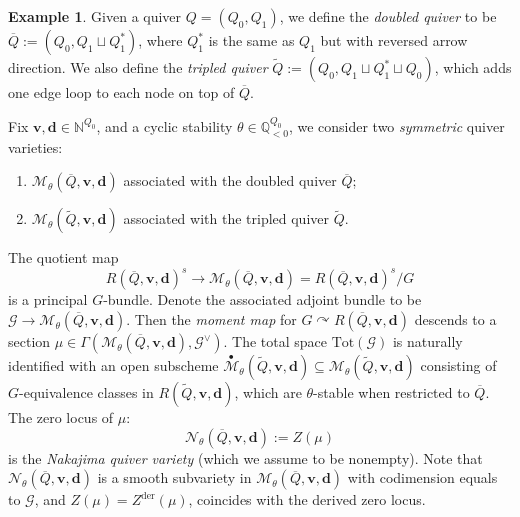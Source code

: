\documentclass[10pt]{amsart}
\theoremstyle{definition}
\newtheorem{Example}[Theorem]{Example}
\numberwithin{equation}{section}
\newcommand{\der}{\mathrm{der}}
\newcommand{\bN}{\mathbb{N}}
\newcommand{\bQ}{\mathbb{Q}}
\newcommand{\cM}{\mathcal{M}}
\newcommand{\cN}{\mathcal{N}}
\begin{document}
\begin{Example}
\label{ex doubled vs tripled}
Given a quiver $Q=(Q_0,Q_1)$, we define the \textit{doubled quiver} to be $\overline{Q}:=(Q_0,Q_1\sqcup Q_1^*)$, where $Q_1^*$ is the same as $Q_1$ but with reversed arrow direction. We also define the \textit{tripled quiver} $\widetilde{Q}:=(Q_0,Q_1\sqcup Q_1^*\sqcup Q_0)$, which adds one edge loop to each node on top of $\overline{Q}$. 

Fix $\mathbf{v},\mathbf{d}\in \bN^{Q_0}$, and a cyclic stability $\theta\in \bQ_{<0}^{Q_0}$, we consider two \textit{symmetric} quiver varieties:
\begin{enumerate}
    \item $\cM_\theta(\overline{Q},\mathbf{v},\mathbf{d})$ associated with the doubled quiver $\overline{Q}$;
    \item $\cM_\theta(\widetilde{Q},\mathbf{v},\mathbf{d})$ associated with the tripled quiver $\widetilde{Q}$.
\end{enumerate}
The quotient map 
$$R(\overline{Q},\mathbf{v},\mathbf{d})^{s}\to \cM_\theta(\overline{Q},\mathbf{v},\mathbf{d})=R(\overline{Q},\mathbf{v},\mathbf{d})^{s}/G$$ is a principal $G$-bundle.
Denote the associated adjoint bundle to be $\mathcal G\to \cM_\theta(\overline{Q},\mathbf{v},\mathbf{d})$. Then the \textit{moment map} for $G\curvearrowright R(\overline{Q},\mathbf{v},\mathbf{d})$ descends to a section $\mu\in \Gamma\left(\cM_\theta(\overline{Q},\mathbf{v},\mathbf{d}),\mathcal G^\vee\right)$. The total space $\mathrm{Tot}(\mathcal G)$ is naturally identified with an open subscheme $\overset{\bullet}{\cM}_\theta(\widetilde{Q},\mathbf{v},\mathbf{d})\subseteq {\cM}_\theta(\widetilde{Q},\mathbf{v},\mathbf{d})$ consisting of $G$-equivalence classes in $R(\widetilde{Q},\mathbf{v},\mathbf{d})$, which are $\theta$-stable when restricted to $\overline{Q}$. 
The zero locus of $\mu$:
$$\cN_{\theta}(\overline{Q},\mathbf{v},\mathbf{d}):=Z(\mu)$$
is the \textit{Nakajima quiver variety} \cite{Nak1,Nak2} (which we assume to be nonempty).  
Note that $\cN_{\theta}(\overline{Q},\mathbf{v},\mathbf{d})$ is a smooth subvariety in $\cM_{\theta}(\overline{Q},\mathbf{v},\mathbf d)$ with codimension equals to $\mathcal G$, and $Z(\mu)=Z^\der(\mu)$, coincides with the derived zero locus. 


\end{Example}
\end{document}
